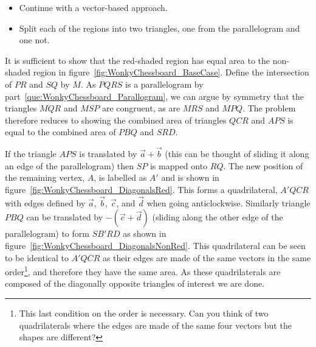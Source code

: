 \begin{parts}
\begin{minipage}{\linewidth}
\begin{tikzpicture}[scale = 1.3]
		\end{tikzpicture}
		\label{fig:WonkyChessboard_BaseCase}
	\end{minipage}
	
	\begin{hints}
		\begin{itemize}
			\item Continue with a vector-based approach.
			\item Split each of the regions into two triangles, one from the parallelogram and one not.
		\end{itemize}
	\end{hints}
	
	\begin{solution}

		It is sufficient to show that the red-shaded region has equal area to the non-shaded region in figure~\ref{fig:WonkyChessboard_BaseCase}. Define the intersection of $PR$ and $SQ$ by $M$. As $PQRS$ is a parallelogram by part~\ref{que:WonkyChessboard_Parallogram}, we can argue by symmetry that the triangles $MQR$ and $MSP$ are congruent, as are $MRS$ and $MPQ$. The problem therefore reduces to showing the combined area of triangles $QCR$ and $APS$ is equal to the combined area of $PBQ$ and $SRD$.
		
		If the triangle $APS$ is translated by $\vec a + \vec b$ (this can be thought of sliding it along an edge of the parallelogram) then $SP$ is mapped onto $RQ$. The new position of the remaining vertex, $A$, is labelled as $A'$ and is shown in figure~\ref{fig:WonkyChessboard_DiagonalsRed}. This forms a quadrilateral, $A'QCR$ with edges defined by $\vec a$, $\vec b$, $\vec c$, and $\vec d$ when going anticlockwise. Similarly triangle $PBQ$ can be translated by $-(\vec c + \vec d)$ (sliding along the other edge of the parallelogram) to form $SB'RD$ as shown in figure~\ref{fig:WonkyChessboard_DiagonalsNonRed}. This quadrilateral can be seen to be identical to $A'QCR$ as their edges are made of the same vectors in the same order\footnote{This last condition on the order is necessary. Can you think of two quadrilaterals where the edges are made of the same four vectors but the shapes are different?}, and therefore they have the same area. As these quadrilaterals are composed of the diagonally opposite triangles of interest we are done.
		
		\begin{minipage}{\linewidth}
			\centering
			\captionsetup{type=figure}
			\begin{minipage}{0.49\linewidth}
				\centering
				\begin{tikzpicture}[scale=1.3]
					

\end{tikzpicture}
\end{minipage}
\end{minipage}
\end{solution}
\end{parts}
